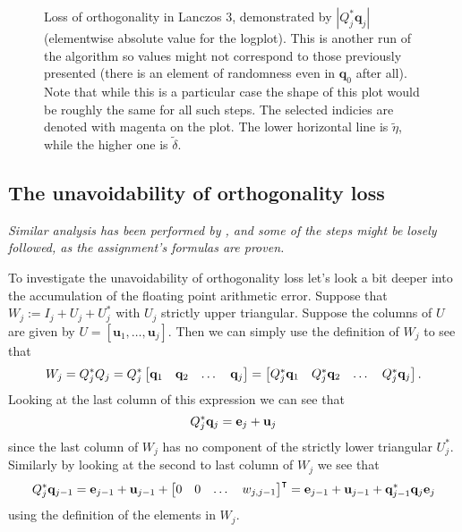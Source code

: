 \documentclass{article}
\begin{document}
\begin{figure}[h!]
	\centering
	\resizebox{0.8\textwidth}{!}{
		}
	\caption{Loss of orthogonality in Lanczos 3, demonstrated by $\left|Q_j^\ast \textbf{q}_j\right|$ (elementwise absolute value for the logplot). This is another run of the algorithm so values might not correspond to those previously presented (there is an element of randomness even in $\textbf{q}_0$ after all). Note that while this is a particular case the shape of this plot would be roughly the same for all such steps. The selected indicies are denoted with magenta on the plot. The lower horizontal line is $\tilde{\eta}$, while the higher one is $\tilde{\delta}$.}\label{fig:lanczos3_Qq}
\end{figure}

\subsection{The unavoidability of orthogonality loss}
\textit{Similar analysis has been performed by \textcite{paige-1980}, and some of the steps might be losely followed, as the assignment's formulas are proven.}

To investigate the unavoidability of orthogonality loss let's look a bit deeper into the accumulation of the floating point arithmetic error. Suppose that $W_j:=I_j+U_j+U_j^{\ast}$ with $U_j$ strictly upper triangular. Suppose the columns of $U$ are given by $U=[\mathbf{u}_1,\ldots,\mathbf{u}_j]$.
Then we can simply use the definition of $W_j$ to see that
\begin{equation}
	W_j = Q_j^\ast Q_j = Q_j^\ast \begin{bmatrix}
		{\bf q}_1 &{\bf q}_2 &\dots &{\bf q}_j
	\end{bmatrix} = \begin{bmatrix}
	Q_j^\ast {\bf q}_1 &Q_j^\ast {\bf q}_2 &\dots &Q_j^\ast {\bf q}_j
	\end{bmatrix}.
\end{equation}
Looking at the last column of this expression we can see that 
\begin{equation}
	Q_j^\ast {\bf q}_j = {\bf e}_j+ {\bf u}_j
\end{equation}
since the last column of $W_j$ has no component of the strictly lower triangular $U_j^\ast$. Similarly by looking at the second to last column of $W_j$ we see that 
\begin{equation}
	Q_j^\ast {\bf q}_{j-1} = {\bf e}_{j-1}+ {\bf u}_{j-1} + \begin{bmatrix}
		0 & 0 & \dots & w_{j,j-1}
	\end{bmatrix}^\intercal = {\bf e}_{j-1}+ {\bf u}_{j-1} + {\bf q}_{j-1}^\ast {\bf q}_j {\bf e}_j
\end{equation}
using the definition of the elements in $W_j$.
\end{document}
